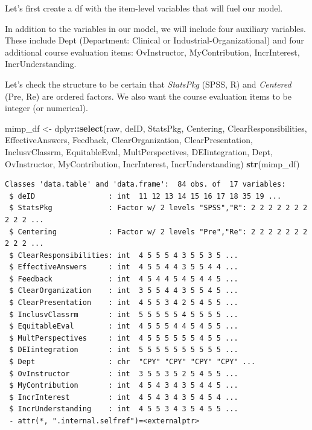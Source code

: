 \documentclass[
  11pt,
]{book}
\newenvironment{Shaded}{\begin{snugshade}}{\end{snugshade}}
\newcommand{\FunctionTok}[1]{\textcolor[rgb]{0.27,0.27,0.27}{\textbf{#1}}}
\newcommand{\NormalTok}[1]{#1}
\newcommand{\OtherTok}[1]{\textcolor[rgb]{0.37,0.37,0.37}{#1}}
\newcommand{\SpecialCharTok}[1]{\textcolor[rgb]{0.43,0.43,0.43}{\textbf{#1}}}
\begin{document}
Let's first create a df with the item-level variables that will fuel our model.

In addition to the variables in our model, we will include four auxiliary variables. These include Dept (Department: Clinical or Industrial-Organizational) and four additional course evaluation items: OvInstructor, MyContribution, IncrInterest, IncrUnderstanding.

Let's check the structure to be certain that \emph{StatsPkg} (SPSS, R) and \emph{Centered} (Pre, Re) are ordered factors. We also want the course evaluation items to be integer (or numerical).

\begin{Shaded}
\begin{Highlighting}[]
\NormalTok{mimp\_df }\OtherTok{\textless{}{-}}\NormalTok{ dplyr}\SpecialCharTok{::}\FunctionTok{select}\NormalTok{(raw, deID, StatsPkg, Centering, ClearResponsibilities,}
\NormalTok{    EffectiveAnswers, Feedback, ClearOrganization, ClearPresentation, InclusvClassrm,}
\NormalTok{    EquitableEval, MultPerspectives, DEIintegration, Dept, OvInstructor,}
\NormalTok{    MyContribution, IncrInterest, IncrUnderstanding)}
\FunctionTok{str}\NormalTok{(mimp\_df)}
\end{Highlighting}
\end{Shaded}

\begin{verbatim}
Classes 'data.table' and 'data.frame':  84 obs. of  17 variables:
 $ deID                 : int  11 12 13 14 15 16 17 18 35 19 ...
 $ StatsPkg             : Factor w/ 2 levels "SPSS","R": 2 2 2 2 2 2 2 2 2 2 ...
 $ Centering            : Factor w/ 2 levels "Pre","Re": 2 2 2 2 2 2 2 2 2 2 ...
 $ ClearResponsibilities: int  4 5 5 5 4 3 5 5 3 5 ...
 $ EffectiveAnswers     : int  4 5 5 4 4 3 5 5 4 4 ...
 $ Feedback             : int  4 5 4 4 5 4 5 4 4 5 ...
 $ ClearOrganization    : int  3 5 5 4 4 3 5 5 4 5 ...
 $ ClearPresentation    : int  4 5 5 3 4 2 5 4 5 5 ...
 $ InclusvClassrm       : int  5 5 5 5 5 4 5 5 5 5 ...
 $ EquitableEval        : int  4 5 5 5 4 4 5 4 5 5 ...
 $ MultPerspectives     : int  4 5 5 5 5 5 5 4 5 5 ...
 $ DEIintegration       : int  5 5 5 5 5 5 5 5 5 5 ...
 $ Dept                 : chr  "CPY" "CPY" "CPY" "CPY" ...
 $ OvInstructor         : int  3 5 5 3 5 2 5 4 5 5 ...
 $ MyContribution       : int  4 5 4 3 4 3 5 4 4 5 ...
 $ IncrInterest         : int  4 5 4 3 4 3 5 4 5 4 ...
 $ IncrUnderstanding    : int  4 5 5 3 4 3 5 4 5 5 ...
 - attr(*, ".internal.selfref")=<externalptr> 
\end{verbatim}
\end{document}
